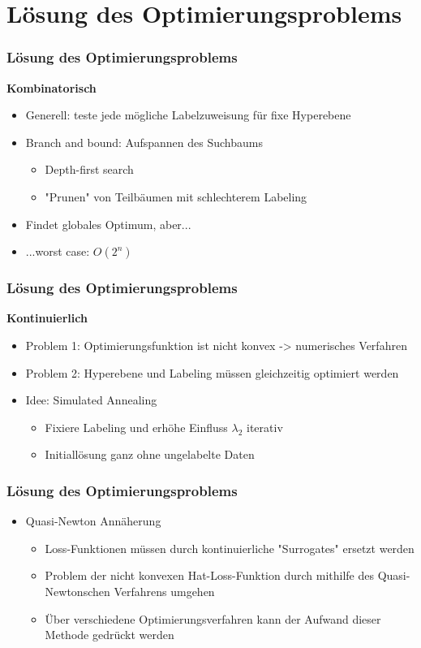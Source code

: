 \documentclass{beamer}
\begin{document}
\section{L\"osung des Optimierungsproblems}

\begin{frame}
    \frametitle{L\"osung des Optimierungsproblems}
    \textbf{Kombinatorisch}
    \begin{itemize}
        \item Generell: teste jede mögliche Labelzuweisung f\"ur fixe Hyperebene
        \item Branch and bound: Aufspannen des Suchbaums
        \begin{itemize}
        	\item Depth-first search
        	\item "Prunen" von Teilb\"aumen mit schlechterem Labeling
        \end{itemize}
        \item Findet globales Optimum, aber...
        \item ...worst case: $O(2^n)$
    \end{itemize}
\end{frame}

\begin{frame}
	\frametitle{L\"osung des Optimierungsproblems}
	\textbf{Kontinuierlich}
	\begin{itemize}
		\item Problem 1: Optimierungsfunktion ist nicht konvex -> numerisches Verfahren
		\item Problem 2: Hyperebene und Labeling m\"ussen gleichzeitig optimiert werden
		\item Idee: Simulated Annealing
		\begin{itemize}
			\item Fixiere Labeling und erhöhe Einfluss $\lambda_2$ iterativ
			\item Initiall\"osung ganz ohne ungelabelte Daten
		\end{itemize}
	\end{itemize}
\end{frame}

\begin{frame}
    \frametitle{L\"osung des Optimierungsproblems}
    \begin{itemize}
        \item Quasi-Newton Ann\"aherung
        \begin{itemize}
            \item Loss-Funktionen m\"ussen durch kontinuierliche "Surrogates" ersetzt werden
            \item Problem der nicht konvexen Hat-Loss-Funktion durch mithilfe des Quasi-Newtonschen Verfahrens umgehen
            \item \"Uber verschiedene Optimierungsverfahren kann der Aufwand dieser Methode gedr\"uckt werden
        \end{itemize}
    \end{itemize}
\end{frame}
\end{document}
